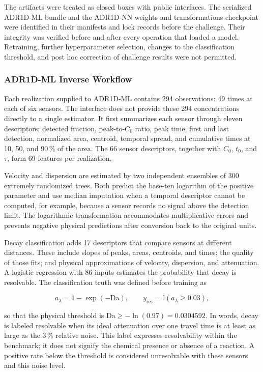 \documentclass[11pt,a4paper]{article}
\begin{document}
The artifacts were treated as closed boxes with public interfaces. The
serialized ADR1D-ML bundle and the ADR1D-NN weights and transformations
checkpoint were identified in their manifests and lock records before the
challenge. Their integrity was verified before and after every operation that
loaded a model. Retraining, further hyperparameter selection, changes to the
classification threshold, and post hoc correction of challenge results were
not permitted.

\subsubsection{ADR1D-ML Inverse Workflow}

Each realization supplied to ADR1D-ML contains 294 observations: 49 times at
each of six sensors. The interface does not provide these 294 concentrations
directly to a single estimator. It first summarizes each sensor through eleven
descriptors: detected fraction, peak-to-$C_0$ ratio, peak time, first and last
detection, normalized area, centroid, temporal spread, and cumulative times at
10, 50, and 90\,\% of the area. The 66 sensor descriptors, together with
$C_0$, $t_0$, and $\tau$, form 69 features per realization.

Velocity and dispersion are estimated by two independent ensembles of 300
extremely randomized trees. Both predict the base-ten logarithm of the positive
parameter and use median imputation when a temporal descriptor cannot be
computed, for example, because a sensor records no signal above the detection
limit. The logarithmic transformation accommodates multiplicative errors and
prevents negative physical predictions after conversion back to the original
units.

Decay classification adds 17 descriptors that compare sensors at different
distances. These include slopes of peaks, areas, centroids, and times; the
quality of those fits; and physical approximations of velocity, dispersion,
and attenuation. A logistic regression with 86 inputs estimates the
probability that decay is resolvable. The classification truth was defined
before training as

\begin{equation}
a_{\lambda}=1-\exp(-\mathrm{Da}), \qquad
y_{\mathrm{res}}=\mathbb{I}\!\left(a_{\lambda}\geq0.03\right),
\label{eq:resolvability}
\end{equation}

so that the physical threshold is
$\mathrm{Da}\geq-\ln(0.97)=0.0304592$. In words, decay is labeled resolvable
when its ideal attenuation over one travel time is at least as large as the
3\,\% relative noise. This label expresses resolvability within the benchmark;
it does not signify the chemical presence or absence of a reaction. A positive
rate below the threshold is considered unresolvable with these sensors and
this noise level.
\end{document}
